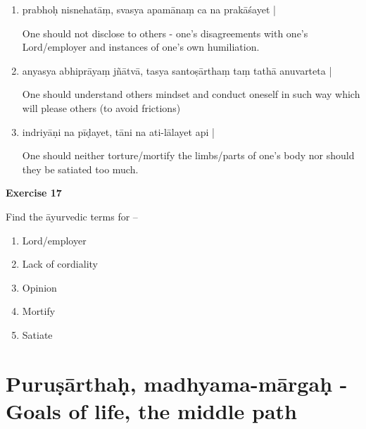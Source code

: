 \begin{enumerate}
\item {}

prabhoḥ nisnehatāṃ, svasya apamānaṃ ca na prakāśayet | 

One should not disclose to others - one's disagreements with one's Lord/employer and instances of one's own humiliation.

\item {}

anyasya abhiprāyaṃ jñātvā, tasya santoṣārthaṃ taṃ tathā anuvarteta |

One should understand others mindset and conduct oneself in such way which will please others (to avoid frictions) 

\item {}

indriyāṇi na pīḍayet, tāni na ati-lālayet api | 

One should neither torture/mortify the limbs/parts of one’s body nor should they be satiated too much.
\end{enumerate}

\begin{center}
\textbf{\large Exercise 17}
\end{center}

Find the āyurvedic terms for –
\begin{enumerate}
\renewcommand{\theenumi}{\alph{enumi}}
\renewcommand{\labelenumi}{\theenumi.}
\item Lord/employer
\item Lack of cordiality
\item Opinion
\item Mortify
\item Satiate
\end{enumerate}

\chapter{Puruṣārthaḥ, madhyama-mārgaḥ - Goals of life, the middle path}

